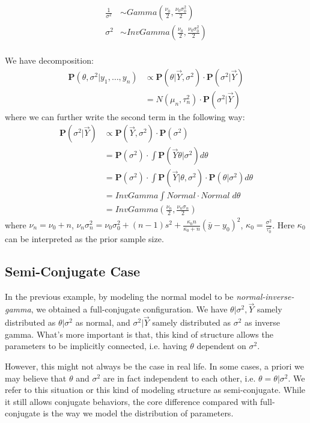 \begin{align*}
    \frac{1}{\sigma^2} &\sim Gamma(\frac{\nu_0}{2}, \frac{\nu_0\sigma_0^2}{2}) \\
    \sigma^2 &\sim InvGamma(\frac{\nu_0}{2}, \frac{\nu_0\sigma_0^2}{2}) \\
\end{align*}

We have decomposition:
\begin{align*}
    \mathbf{P}(\theta, \sigma^2 | y_1, \ldots, y_n) &\propto \mathbf{P}(\theta | \vec{Y}, \sigma^2) \cdot \mathbf{P}(\sigma^2 | \vec{Y}) \\
    &= N(\mu_n, \tau_n^2) \cdot \mathbf{P}(\sigma^2 | \vec{Y})
\end{align*}
where we can further write the second term in the following way:
\begin{align*}
    \mathbf{P}(\sigma^2 | \vec{Y}) &\propto \mathbf{P}(\vec{Y}, \sigma^2) \cdot \mathbf{P}(\sigma^2) \\
    &= \mathbf{P}(\sigma^2) \cdot \int \mathbf{P}(\vec{Y} \theta | \sigma^2) d\theta \\
    &= \mathbf{P}(\sigma^2) \cdot \int \mathbf{P}(\vec{Y} | \theta, \sigma^2) \cdot \mathbf{P}(\theta | \sigma^2) d\theta \\
    &=InvGamma \int Normal \cdot Normal \;d\theta \\
    &= InvGamma(\frac{\nu_n}{2}, \frac{\nu_n\sigma_n}{2})
\end{align*}
where $\nu_n = \nu_0 + n$, $\nu_n\sigma_n^2 = \nu_0\sigma_0^2 + (n-1)s^2 + \frac{\kappa_0n}{\kappa_0 + n}(\bar{y} - y_0)^2$, $\kappa_0 = \frac{\sigma^2}{\tau_0^2}$. Here $\kappa_0$ can be interpreted as the prior sample size. 

\subsection*{Semi-Conjugate Case}
In the previous example, by modeling the normal model to be \emph{normal-inverse-gamma}, we obtained a full-conjugate configuration. We have $\theta | \sigma^2, \vec{Y}$ samely distributed as $\theta | \sigma^2$ as normal, and $\sigma^2 | \vec{Y}$ samely distributed as $\sigma^2$ as inverse gamma. What's more important is that, this kind of structure allows the parameters to be implicitly connected, i.e. having $\theta$ dependent on $\sigma^2$.

However, this might not always be the case in real life. In some cases, a priori we may believe that $\theta$ and $\sigma^2$ are in fact independent to each other, i.e. $\theta = \theta | \sigma^2$. We refer to this situation or this kind of modeling structure as semi-conjugate. While it still allows conjugate behaviors, the core difference compared with full-conjugate is the way we model the distribution of parameters. 

